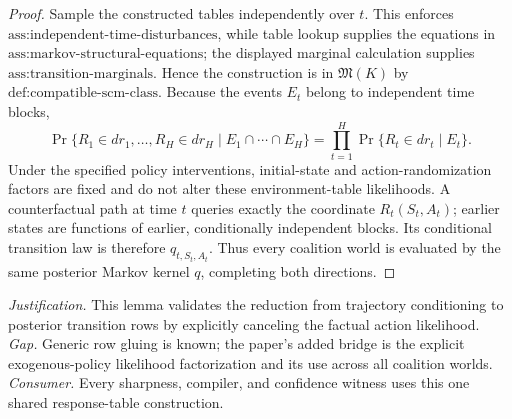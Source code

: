 \documentclass{article}
\begin{document}
\begin{proof}
Sample the constructed tables independently over \(t\).  This enforces \(\text{ass:independent-time-disturbances}\), while table lookup supplies the equations in \(\text{ass:markov-structural-equations}\); the displayed marginal calculation supplies \(\text{ass:transition-marginals}\).  Hence the construction is in \(\mathfrak M(K)\) by \(\text{def:compatible-scm-class}\).  Because the events \(E_t\) belong to independent time blocks,
\[
 \Pr\{R_1\in dr_1,\ldots,R_H\in dr_H\mid E_1\cap\cdots\cap E_H\}
 =\prod_{t=1}^H\Pr\{R_t\in dr_t\mid E_t\}.
\]
Under the specified policy interventions, initial-state and action-randomization factors are fixed and do not alter these environment-table likelihoods.  A counterfactual path at time \(t\) queries exactly the coordinate \(R_t(S_t,A_t)\); earlier states are functions of earlier, conditionally independent blocks.  Its conditional transition law is therefore \(q_{t,S_t,A_t}\).  Thus every coalition world is evaluated by the same posterior Markov kernel \(q\), completing both directions.
\end{proof}
\par\smallskip\noindent \textit{Justification.} This lemma validates the reduction from trajectory conditioning to posterior transition rows by explicitly canceling the factual action likelihood. \textit{Gap.} Generic row gluing is known; the paper's added bridge is the explicit exogenous-policy likelihood factorization and its use across all coalition worlds. \textit{Consumer.} Every sharpness, compiler, and confidence witness uses this one shared response-table construction.
\end{document}
